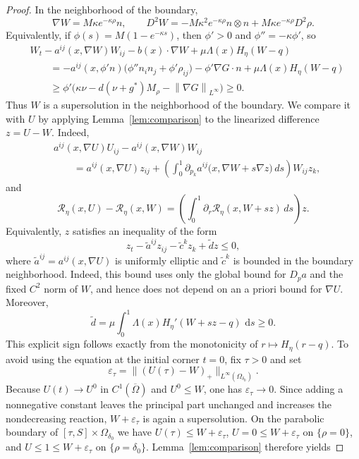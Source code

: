 \documentclass[11pt]{article}
\theoremstyle{remark}
\newcommand{\nupar}{\nu}
\newcommand{\dd}{\,\mathrm{d}}
\newcommand{\norm}[1]{\left\lVert #1\right\rVert}
\newcommand{\cT}{\mathcal{R}}
\begin{document}
\begin{proof}
In the neighborhood of the boundary,
\[
        \nabla W=M\kappa e^{-\kappa\rho}n,
        \qquad
        D^2W=-M\kappa^2 e^{-\kappa\rho} n\otimes n
        +M\kappa e^{-\kappa\rho}D^2\rho.
\]
Equivalently, if $\phi(s)=M(1-e^{-\kappa s})$, then $\phi'>0$ and $\phi''=-\kappa\phi'$, so
\[
\begin{aligned}
        &W_t-a^{ij}(x,\nabla W)W_{ij}-b(x)\cdot\nabla W
        +\mu\Lambda(x)H_\eta(W-q) \\
        &\qquad
        =-a^{ij}(x,\phi'n)\bigl(\phi'' n_i n_j+\phi'\rho_{ij}\bigr)
        -\phi'\nabla G\cdot n
        +\mu\Lambda(x)H_\eta(W-q) \\
        &\qquad
        \ge
        \phi'\bigl(\kappa\nupar-d(\nupar+g^*)M_\rho-\norm{\nabla G}_{L^\infty}\bigr)
        \ge0.
\end{aligned}
\]
Thus $W$ is a supersolution in the neighborhood of the boundary.  We compare it with $U$ by applying Lemma~\ref{lem:comparison} to the linearized difference $z=U-W$.  Indeed,
\[
\begin{aligned}
        &a^{ij}(x,\nabla U)U_{ij}-a^{ij}(x,\nabla W)W_{ij} \\
        &\qquad =a^{ij}(x,\nabla U)z_{ij}
        +\left(\int_0^1 \partial_{p_k}a^{ij}\bigl(x,\nabla W+s\nabla z\bigr)\,ds\right)W_{ij}z_k,
\end{aligned}
\]
and
\[
        \cT_\eta(x,U)-\cT_\eta(x,W)
        =\left(\int_0^1 \partial_r\cT_\eta(x,W+s z)\,ds\right)z .
\]
Equivalently, $z$ satisfies an inequality of the form
\[
        z_t-\tilde a^{ij}z_{ij}-\tilde c^k z_k+\tilde d z\le0,
\]
where $\tilde a^{ij}=a^{ij}(x,\nabla U)$ is uniformly elliptic and $\tilde c^k$ is bounded in the boundary neighborhood.  Indeed, this bound uses only the global bound for $D_pa$ and the fixed $C^2$ norm of $W$, and hence does not depend on an a priori bound for $\nabla U$.  Moreover,
\[
        \tilde d
        =\mu\int_0^1\Lambda(x)H_\eta'(W+s z-q)\,\dd s\ge0.
\]
This explicit sign follows exactly from the monotonicity of $r\mapsto H_\eta(r-q)$.  To avoid using the equation at the initial corner $t=0$, fix $\tau>0$ and set
\[
 \varepsilon_\tau=\bigl\|(U(\tau)-W)_+\bigr\|_{L^\infty(\Omega_{\delta_0})}.
\]
Because $U(t)\to U^0$ in $C^1(\overline\Omega)$ and $U^0\le W$, one has $\varepsilon_\tau\to0$.  Since adding a nonnegative constant leaves the principal part unchanged and increases the nondecreasing reaction, $W+\varepsilon_\tau$ is again a supersolution.  On the parabolic boundary of $[\tau,S]\times\Omega_{\delta_0}$ we have
$U(\tau)\le W+\varepsilon_\tau$, $U=0\le W+\varepsilon_\tau$ on $\{\rho=0\}$, and $U\le1\le W+\varepsilon_\tau$ on $\{\rho=\delta_0\}$.  Lemma~\ref{lem:comparison} therefore yields

\end{proof}
\end{document}
